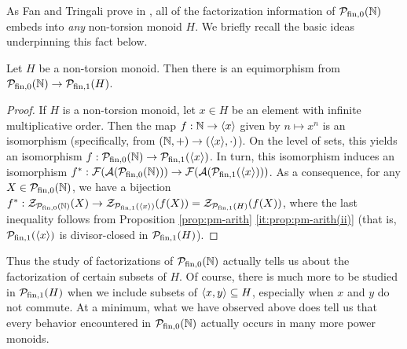 





As Fan and Tringali prove in \cite[Theorem 3.8, Theorem 4.11]{fan-tringali18}, all of the factorization information of ${\mathcal{P}_{\textrm{fin},0}(\mathbb{N})}$ embeds into \textit{any} non-torsion monoid $H$.
We briefly recall the basic ideas underpinning this fact below.

\begin{prop}\label{prop:natural-to-non-tors}
	Let $H$ be a non-torsion monoid.
	Then there is an equimorphism from ${\mathcal{P}_{\textrm{fin},0}(\mathbb{N})} \to \mathcal{P}_{\textrm{fin}, 1}(H)$.
\end{prop}
\begin{proof}
	If $H$ is a non-torsion monoid, let $x\in H$ be an element with infinite multiplicative order.  
	Then the map $f: \mathbb{N} \to \langle x \rangle$ given by $n\mapsto x^n$ is an isomorphism (specifically, from $(\mathbb{N},+)\to (\langle x \rangle,\cdot)$).
	On the level of sets, this yields an isomorphism $f: {\mathcal{P}_{\textrm{fin},0}(\mathbb{N})} \to \mathcal{P}_{\textrm{fin}, 1}(\langle x \rangle)$.
	In turn, this isomorphism induces an isomorphism $f^*: \mathcal{F}(\mathcal{A}({\mathcal{P}_{\textrm{fin},0}(\mathbb{N})})) \to \mathcal{F}(\mathcal{A}(\mathcal{P}_{\textrm{fin}, 1}(\langle x \rangle)))$.
	As a consequence, for any $X \in {\mathcal{P}_{\textrm{fin},0}(\mathbb{N})}$, we have a bijection $f^*: \mathcal{Z}_{{\mathcal{P}_{\textrm{fin},0}(\mathbb{N})}}(X) \to \mathcal{Z}_{\mathcal{P}_{\textrm{fin}, 1}(\langle x \rangle)}(f(X)) = \mathcal{Z}_{\mathcal{P}_{\textrm{fin}, 1}(H)}(f(X))$, where the last inequality follows from Proposition \ref{prop:pm-arith} \ref{it:prop:pm-arith(ii)} (that is, $\mathcal{P}_{\textrm{fin}, 1}(\langle x \rangle)$ is divisor-closed in $\mathcal{P}_{\textrm{fin}, 1}(H)$).
\end{proof}

Thus the study of factorizations of ${\mathcal{P}_{\textrm{fin},0}(\mathbb{N})}$ actually tells us about the factorization of certain subsets of $H$.
Of course, there is much more to be studied in $\mathcal{P}_{\textrm{fin}, 1}(H)$ when we include subsets of $\langle x,y \rangle\subseteq H$, especially when $x$ and $y$ do not commute.
At a minimum, what we have observed above does tell us that every behavior encountered in ${\mathcal{P}_{\textrm{fin},0}(\mathbb{N})}$ actually occurs in many more power monoids.

